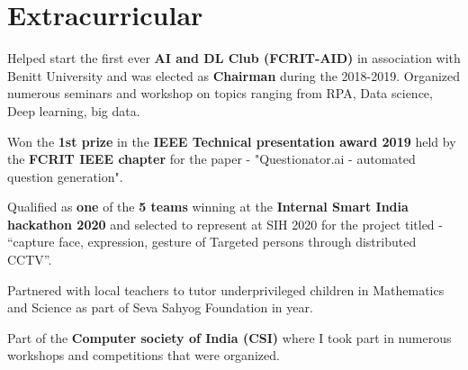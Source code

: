\documentclass[letterpaper,11pt]{article}
\begin{document}

\section{Extracurricular}
\begin{itemize}
\small{
    \item Helped start the first ever \textbf{AI and DL Club (FCRIT-AID)} in association with Benitt University and was elected as \textbf{Chairman} during the 2018-2019. Organized numerous seminars and workshop on topics ranging from RPA, Data science, Deep learning, big data.  

    \item Won the \textbf{1st prize} in the \textbf{IEEE Technical presentation award 2019} held by the \textbf{FCRIT IEEE chapter} for the paper - "Questionator.ai - automated question generation". 

    \item Qualified as \textbf{one} of the \textbf{5 teams} winning at the \textbf{Internal Smart India hackathon 2020} and selected to represent at SIH 2020 for the project titled - “capture face, expression, gesture of Targeted persons through distributed CCTV”. 

    \item Partnered with local teachers to tutor underprivileged children in Mathematics and Science as part of Seva Sahyog Foundation in year.  

    \item Part of the \textbf{Computer society of India (CSI)} where I took part in numerous workshops and competitions that were organized. 
    
}

\end{itemize}
\end{document}
